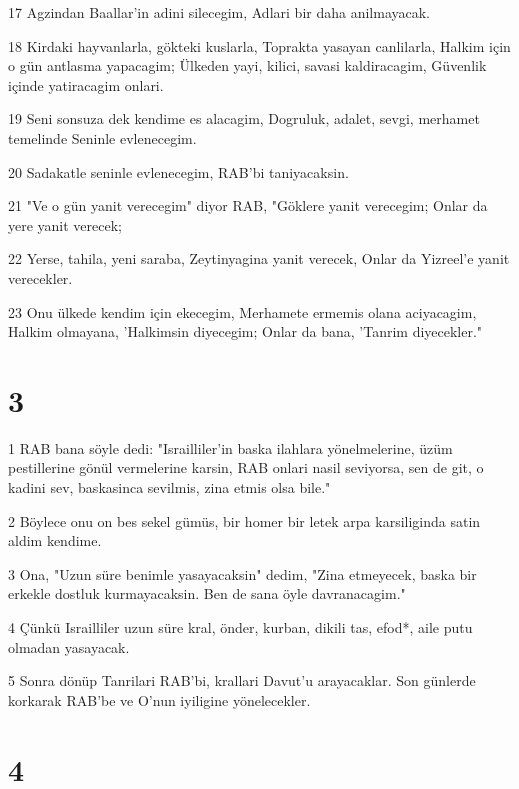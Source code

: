 \par 17 Agzindan Baallar'in adini silecegim, Adlari bir daha anilmayacak.
\par 18 Kirdaki hayvanlarla, gökteki kuslarla, Toprakta yasayan canlilarla, Halkim için o gün antlasma yapacagim; Ülkeden yayi, kilici, savasi kaldiracagim, Güvenlik içinde yatiracagim onlari.
\par 19 Seni sonsuza dek kendime es alacagim, Dogruluk, adalet, sevgi, merhamet temelinde Seninle evlenecegim.
\par 20 Sadakatle seninle evlenecegim, RAB'bi taniyacaksin.
\par 21 "Ve o gün yanit verecegim" diyor RAB, "Göklere yanit verecegim; Onlar da yere yanit verecek;
\par 22 Yerse, tahila, yeni saraba, Zeytinyagina yanit verecek, Onlar da Yizreel'e yanit verecekler.
\par 23 Onu ülkede kendim için ekecegim, Merhamete ermemis olana aciyacagim, Halkim olmayana, 'Halkimsin diyecegim; Onlar da bana, 'Tanrim diyecekler."

\chapter{3}

\par 1 RAB bana söyle dedi: "Israilliler'in baska ilahlara yönelmelerine, üzüm pestillerine gönül vermelerine karsin, RAB onlari nasil seviyorsa, sen de git, o kadini sev, baskasinca sevilmis, zina etmis olsa bile."
\par 2 Böylece onu on bes sekel gümüs, bir homer bir letek arpa karsiliginda satin aldim kendime.
\par 3 Ona, "Uzun süre benimle yasayacaksin" dedim, "Zina etmeyecek, baska bir erkekle dostluk kurmayacaksin. Ben de sana öyle davranacagim."
\par 4 Çünkü Israilliler uzun süre kral, önder, kurban, dikili tas, efod*, aile putu olmadan yasayacak.
\par 5 Sonra dönüp Tanrilari RAB'bi, krallari Davut'u arayacaklar. Son günlerde korkarak RAB'be ve O'nun iyiligine yönelecekler.

\chapter{4}

